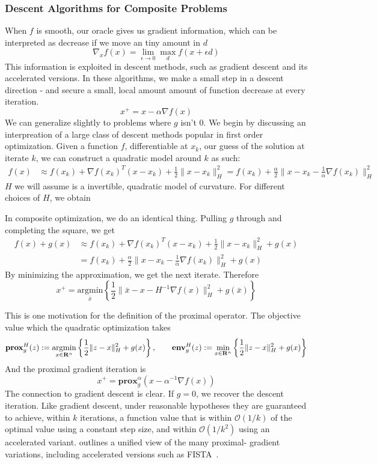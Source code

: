 \subsubsection{Descent Algorithms for Composite Problems}
When $f$ is smooth,
our oracle gives us gradient information, which can be interpreted as decrease
if we move an tiny amount in $d$
$$
\nabla_x f(x) = \lim_{\epsilon \rightarrow 0}\max_d f(x + \epsilon d)
$$
This information is exploited in descent methods, such as gradient
descent and its accelerated versions. In these algorithms, we make a 
small step in a descent direction - and secure a small, local amount
amount of function decrease at every iteration. 
$$
x^+ = x - \alpha \nabla f(x)
$$
We can generalize slightly to problems where $g$ isn't $0$. We begin by
discussing an interpreation of a large class of descent methods popular in
first order optimization. Given a  function $f$, differentiable at $x_k$, our
guess of the solution at  iterate $k$, we can construct a quadratic model
around $k$ as such:
\begin{align*} 
f(x) & \approx f(x_{k})+\nabla f(x_{k})^{T}(x-x_{k})+\frac{1}{2}\|x-x_{k}\|_{H}^{2} =f(x_{k})+\frac{\alpha}{2}\|x-x_{k}-\frac{1}{\alpha}\nabla f(x_{k})\|_H^{2}
\end{align*}
$H$ we will assume is a invertible, quadratic model of curvature. For
different choices of $H$, we obtain

In composite optimization, we do an identical thing. Pulling $g$ 
through and completing the square, we get
\begin{align*}
f(x)+g(x) & \approx f(x_{k})+\nabla f(x_{k})^{T}(x-x_{k})+\frac{1}{2}\|x-x_{k}\|_{H}^{2}+g(x)\\
 & =f(x_{k})+\frac{\alpha}{2}\|x-x_{k}-\frac{1}{\alpha}\nabla f(x_{k})\|_H^{2}+g(x)
\end{align*}
By minimizing the approximation, we get the next iterate. Therefore
$$
x^{+}=\underset{\bar{x}}{\mbox{argmin}}\left\{ 
\frac{1}{2}\|\bar{x}-x-H^{-1}\nabla f(x)\|_{H}^{2}
+g(\bar{x})\right\} 
$$

This is one
motivation for the definition of the proximal operator. The objective
value which the quadratic optimization takes $$
\mathbf{prox}^H_{g}(z):  =\underset{x\in\mathbf{R}^{n}}{\text{argmin}}\left\{
\frac{1}{2}\|z-x\|_H^{2}+g(x)\right\}, \qquad  \mathbf{env}^H_{g}(z):
=\underset{x\in\mathbf{R}^{n}}{\text{min}}\left\{
\frac{1}{2}\|z-x\|_H^{2}+g(x)\right\}  $$ And the proximal gradient
iteration is 
\begin{equation}\label{eq:prox-gradient}
x^{+}=\mathbf{prox}^\alpha_g(x-\alpha^{-1}\nabla f(x))
\end{equation}
The connection to gradient descent is clear. If $g=0$, we recover
the descent iteration. Like gradient descent, under reasonable
hypotheses they are guaranteed to achieve, within $k$ iterations, a
function value that is within $\mathcal{O}(1/k)$ of the optimal value
using a constant step size, and within $\mathcal{O}(1/k^2)$ using an
accelerated variant. \cite{Tseng:2010} outlines a unified view of the
many proximal- gradient variations, including accelerated versions
such as FISTA~\cite{beck2009fast}.

